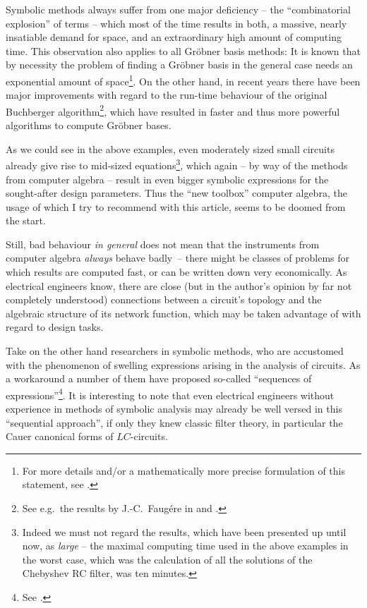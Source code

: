 \documentclass[10pt,twocolumn,pagenumbers]{IEEEtran}
\begin{document}
Symbolic methods always suffer from one major deficiency -- the ``combinatorial explosion'' of terms -- which most of the time results in both, a massive, nearly insatiable demand for space, and an extraordinary high amount of computing time. This observation also applies to all Gr\"obner basis methods:
It is known that by necessity the problem of finding a Gr\"obner basis in the general case needs an exponential amount of space\footnote{For more details and/or a mathematically more precise formulation of this statement, see \cite{ModernCA}.}. On the other hand, in recent years there have been major improvements with regard to the run-time behaviour of the original Buchberger algorithm\footnote{See e.g.\ the results by J.-C.\ Faug\'ere in \cite{F4} and \cite{F5}.}, which have resulted in faster and thus more powerful algorithms to compute Gr\"obner bases. 

As we could see in the above examples, even moderately sized small circuits already give rise to mid-sized equations\footnote{Indeed we must not regard the results, which have been presented up until now, as {\sl large} -- the maximal computing time used in the above examples in the worst case, which was the calculation of all the solutions of the Chebyshev RC filter, was ten minutes.}, which again -- by way of the methods from computer algebra -- result in even bigger symbolic expressions for the sought-after design parameters. Thus the ``new toolbox'' computer algebra, the usage of which I try to recommend with this article, seems to be doomed from the start.

Still, bad behaviour {\sl in general} does not mean that the instruments from computer algebra {\sl always} behave \hbox{badly --} there might be classes of problems for which results are computed fast, or can be written down very economically. As electrical engineers know, there are close (but in the author's opinion by far not completely understood) connections between a circuit's topology and the algebraic structure of its network function, which may be taken advantage of with regard to design tasks.

Take on the other hand researchers in symbolic methods, who are accustomed with the phenomenon of swelling expressions arising in the analysis of circuits. As a workaround a number of them have proposed so-called ``sequences of expressions''\footnote{See \cite{RodanskiHassoun}.}. It is interesting to note that even electrical engineers without experience in methods of symbolic analysis may already be well versed in this ``sequential approach'', if only they knew classic filter theory, in particular the Cauer canonical forms of $LC$-circuits.
\end{document}
